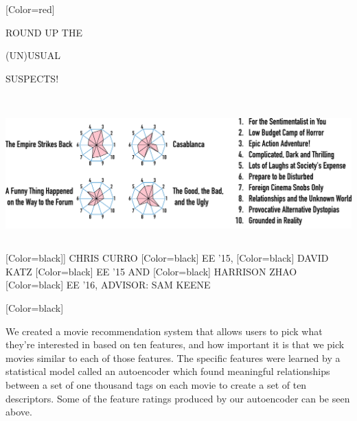 \documentclass{article}
\begin{document}
\begin{minipage}[c]{28in}
{ 
[Color=red]
\fontsize{3.5in}{0.5in}\selectfont 
\bfseries





ROUND UP THE

\vspace{0.5in}

{ (UN)}USUAL 

\vspace{0.5in}

SUSPECTS!

}
\end{minipage}
\vspace{1in}\\
\colorbox{white}{
\begin{minipage}{28in}
\centering
\includegraphics[width=27in]{figure.pdf}
\end{minipage}
}
\vspace{1in}\\
{
[Color=black]]
\fontsize{1in}{1em}\selectfont 
CHRIS CURRO
}
{
[Color=black]
\fontsize{0.8in}{1em}\selectfont 
EE '15,
}
{
[Color=black]
\fontsize{1in}{1em}\selectfont 
DAVID KATZ
}
{
[Color=black]
\fontsize{0.8in}{1em}\selectfont 
EE '15 AND
}
{
[Color=black]
\fontsize{1in}{1em}\selectfont 
HARRISON ZHAO
}
{
[Color=black]
\fontsize{0.8in}{1em}\selectfont 
EE '16, ADVISOR: SAM KEENE
}
\vspace{0.8in}\\
\begin{minipage}{15.5in}
{
	[Color=black]
	\fontsize{0.6in}{8em}\selectfont

	We created a movie recommendation system that allows users to pick what
	they're interested in based on ten features, and how important it is that we
	pick movies similar to each of those features. The specific features were
	learned by a statistical model called an autoencoder which found
	meaningful relationships between a set of one thousand tags on each movie
	to create a set of ten descriptors. Some of the feature ratings produced by
	our autoencoder can be seen above.


} \end{minipage} 
\end{document}
